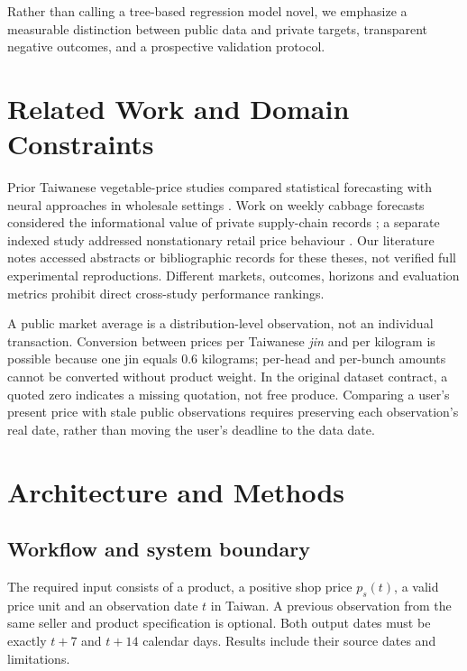 \documentclass[11pt,a4paper]{article}
\begin{document}
Rather than calling a tree-based regression model novel, we emphasize a measurable distinction between public data and private targets, transparent negative outcomes, and a prospective validation protocol.

\section{Related Work and Domain Constraints}
Prior Taiwanese vegetable-price studies compared statistical forecasting with neural approaches in wholesale settings \cite{chen2024}. Work on weekly cabbage forecasts considered the informational value of private supply-chain records \cite{lee2015}; a separate indexed study addressed nonstationary retail price behaviour \cite{lin2017}. Our literature notes accessed abstracts or bibliographic records for these theses, not verified full experimental reproductions. Different markets, outcomes, horizons and evaluation metrics prohibit direct cross-study performance rankings.

A public market average is a distribution-level observation, not an individual transaction. Conversion between prices per Taiwanese \emph{jin} and per kilogram is possible because one jin equals $0.6$ kilograms; per-head and per-bunch amounts cannot be converted without product weight. In the original dataset contract, a quoted zero indicates a missing quotation, not free produce. Comparing a user's present price with stale public observations requires preserving each observation's real date, rather than moving the user's deadline to the data date.

\section{Architecture and Methods}
\subsection{Workflow and system boundary}
The required input consists of a product, a positive shop price $p_s(t)$, a valid price unit and an observation date $t$ in Taiwan. A previous observation from the same seller and product specification is optional. Both output dates must be exactly $t+7$ and $t+14$ calendar days. Results include their source dates and limitations.
\end{document}
